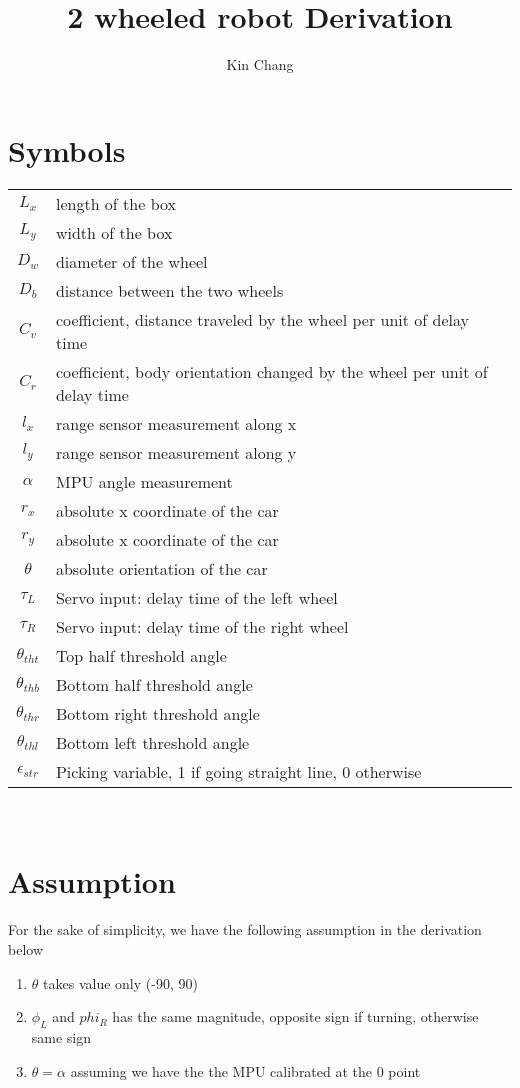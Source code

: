 \documentclass[12pt, letterpaper]{amsart} %
\author{Kin Chang}
\title{2 wheeled robot Derivation}
\numberwithin{equation}{section}
\begin{document}
\maketitle
\section{Symbols}
\begin{tabular}{cp{}}
  $L_x$ & length of the box  \\
  $L_y$ & width of the box \\
  $D_w$ & diameter of the wheel \\
  $D_b$ & distance between the two wheels \\
  $C_v$ & coefficient, distance traveled by the wheel per unit of delay time \\
  $C_r$ & coefficient, body orientation changed by the wheel per unit of delay time \\
  $l_x$ & range sensor measurement along x \\
  $l_y$ & range sensor measurement along y \\
  $\alpha$ & MPU angle measurement \\
  $r_x$ & absolute x coordinate of the car \\
  $r_y$ & absolute x coordinate of the car \\
  $\theta$ & absolute orientation of the car \\
  $\tau_L$ & Servo input: delay time of the left wheel \\
  $\tau_R$ & Servo input: delay time of the right wheel \\
  $\theta_{tht}$ & Top half threshold angle \\
  $\theta_{thb}$ & Bottom half threshold angle \\
  $\theta_{thr}$ & Bottom right threshold angle \\
  $\theta_{thl}$ & Bottom left threshold angle \\
  $\epsilon_{str}$ & Picking variable, 1 if going straight line, 0 otherwise
\end{tabular}\\
\section{Assumption}
For the sake of simplicity, we have the following assumption in the derivation below
\begin{enumerate}
\item $\theta$ takes value only (-90, 90)
\item $\phi_L$ and $phi_R$ has the same magnitude, opposite sign if turning, otherwise same sign 
\item $\theta = \alpha$ assuming we have the the MPU calibrated at the 0 point
\end{enumerate}  
\end{document}
